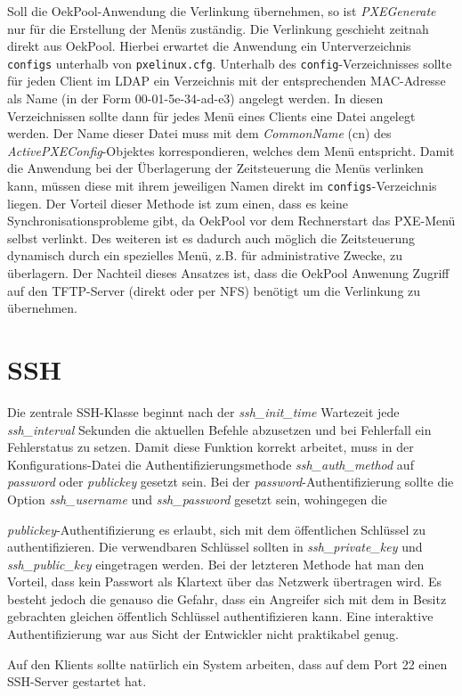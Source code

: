 \documentclass[	
				a4paper, 
				twoside,
				11pt,
				DIV11,
				BCOR12mm,
				bibtotoc, 
				halfparskip, 
				headsepline, 
				pointlessnumbers]{scrartcl}
\begin{document}
Soll die OekPool-Anwendung die Verlinkung übernehmen, so ist \textit{PXEGenerate} nur für die Erstellung der Menüs zuständig.
Die Verlinkung geschieht zeitnah direkt aus OekPool. Hierbei erwartet die Anwendung ein Unterverzeichnis \verb+configs+ unterhalb von \verb+pxelinux.cfg+.
Unterhalb des \verb+config+-Verzeichnisses sollte für jeden Client im LDAP ein Verzeichnis mit der entsprechenden MAC-Adresse als Name (in der Form 00-01-5e-34-ad-e3) angelegt werden.
In diesen Verzeichnissen sollte dann für jedes Menü eines Clients eine Datei angelegt werden.
Der Name dieser Datei muss mit dem \textit{CommonName} (cn) des \textit{ActivePXEConfig}-Objektes korrespondieren, welches dem Menü entspricht.
Damit die Anwendung bei der Überlagerung der Zeitsteuerung die Menüs verlinken kann, müssen diese mit ihrem jeweiligen Namen direkt im \verb+configs+-Verzeichnis liegen.
Der Vorteil dieser Methode ist zum einen, dass es keine Synchronisationsprobleme gibt, da OekPool vor dem Rechnerstart das PXE-Menü selbst verlinkt.
Des weiteren ist es dadurch auch möglich die Zeitsteuerung dynamisch durch ein spezielles Menü, z.B. für administrative Zwecke, zu überlagern.
Der Nachteil dieses Ansatzes ist, dass die OekPool Anwenung Zugriff auf den TFTP-Server (direkt oder per NFS) benötigt um die Verlinkung zu übernehmen.


\section{SSH}
Die zentrale SSH-Klasse beginnt nach der \textit{ssh\_init\_time} Wartezeit jede \textit{ssh\_interval} Sekunden die aktuellen Befehle abzusetzen und bei Fehlerfall ein Fehlerstatus zu setzen. Damit diese Funktion korrekt arbeitet, muss in der Konfigurations-Datei die Authentifizierungsmethode \textit{ssh\_auth\_method} auf \textit{password} oder \textit{publickey} gesetzt sein. 
Bei der \textit{password}-Authentifizierung sollte die Option \textit{ssh\_username} und \textit{ssh\_password} gesetzt sein, wohingegen die 

\textit{publickey}-Authentifizierung es erlaubt, sich mit dem öffentlichen Schlüssel zu authentifizieren. Die verwendbaren Schlüssel sollten in \textit{ssh\_private\_key} und \textit{ssh\_public\_key} eingetragen werden. Bei der letzteren Methode hat man den Vorteil, dass kein Passwort als Klartext über das Netzwerk übertragen wird. Es besteht jedoch die genauso die Gefahr, dass ein Angreifer sich mit dem in Besitz gebrachten gleichen öffentlich Schlüssel authentifizieren kann. Eine interaktive Authentifizierung war aus Sicht der Entwickler nicht praktikabel genug.

Auf den Klients sollte natürlich ein System arbeiten, dass auf dem Port 22 einen SSH-Server gestartet hat.
\end{document}
